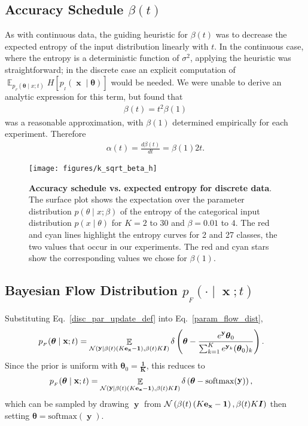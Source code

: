 \documentclass[11pt,table]{article}
\DeclareMathOperator*{\E}{\mathbb{E}}
\DeclareMathOperator{\x}{\mathbf{x}}
\DeclareMathOperator{\y}{\mathbf{y}}
\newcommand{\N}[2]{\mathcal{N}\left(#1 , #2\right)}
\newcommand{\I}[1]{\boldsymbol{I}}
\newcommand{\tidx}[2]{#1_{#2}}
\renewcommand{\vec}[1]{\boldsymbol{#1}}
\newcommand{\pars}{\theta}
\newcommand{\parsn}{\vec{\pars}}
\newcommand{\parsnt}[1]{\tidx{\parsn}{#1}}
\newcommand{\0}[1]{\constvec{0}{#1}}
\newcommand{\1}[1]{\constvec{1}{#1}}
\newcommand{\oh}[2]{\mathbf{e}_{#1}}
\newcommand{\inp}{p_{_I}}
\newcommand{\flow}{p_{_F}}
\begin{document}
\subsection{Accuracy Schedule \texorpdfstring{$\beta(t)$}{}}\label{sec:disc_beta}
As with continuous data, the guiding heuristic for $\beta(t)$ was to decrease the expected entropy of the input distribution linearly with $t$. In the continuous case, where the entropy is a deterministic function of $\sigma^2$, applying the heuristic was straightforward; in the discrete case an explicit computation of $\E_{\flow(\parsn \mid x; t)} H\left[\inp(\x \mid \parsn)\right]$ would be needed.
We were unable to derive an analytic expression for this term, but found that
\begin{align}
\beta(t) = t^2 \beta(1)\label{disc_beta_t}
\end{align}
was a reasonable approximation, with $\beta(1)$ determined empirically for each experiment.
Therefore
\begin{align}
\alpha(t) = \frac{d \beta(t)}{d t} = \beta(1) 2t.\label{disc_alpha_t}
\end{align}

\begin{figure}[t!]
\begin{centering}
\texttt{[image: figures/k\_sqrt\_beta\_h]}
\caption{\textbf{Accuracy schedule vs. expected entropy for discrete data}. The surface plot shows the expectation over the parameter distribution $p(\theta \mid x; \beta)$ of the entropy of the categorical input distribution $p(x \mid \theta)$ for $K=2$ to $30$ and $\beta=0.01$ to $4$. The red and cyan lines highlight the entropy curves for 2 and 27 classes, the two values that occur in our experiments. The red and cyan stars show the corresponding values we chose for $\beta(1)$.}
\end{centering}
\label{fig:disc_acc_vs_entropy}
\end{figure}
\subsection{Bayesian Flow Distribution \texorpdfstring{$\flow(\cdot \mid \x; t)$}{}}
Substituting Eq.~\ref{disc_par_update_def} into Eq.~\ref{param_flow_dist},
\begin{align}
\flow(\parsn \mid \x; t) &= \E_{\N{\y \mid \beta(t)\left(K \oh{\x}{KD} - \1{KD}\right)}{\beta(t) K \I{KD}}} \delta\left(\parsn - \frac{e^{\y}\parsnt{0}}{\sum_{k=1}^K e^{\y_k}(\parsnt{0})_{k}}\right).
\end{align}
Since the prior is uniform with $\parsnt{0} = \vec{\frac{1}{K}}$, this reduces to
\begin{align}
\flow(\parsn \mid \x; t) &= \E_{\N{\y \mid \beta(t)\left(K \oh{\x}{KD} - \1{KD}\right)}{\beta(t) K \I{KD}}} \delta\left(\parsn - \text{softmax}(\y)\right),\label{disc_param_flow}
\end{align}
which can be sampled by drawing $\y$ from $\N{\beta(t)\left(K \oh{\x}{KD} - \1{KD}\right)}{\beta(t) K \I{KD}}$ then setting $\parsn = \text{softmax}(\y)$.
\end{document}
